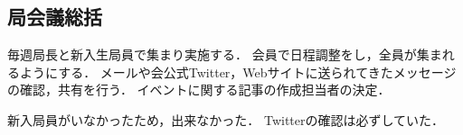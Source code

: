 \subsection*{局会議総括}



毎週局長と新入生局員で集まり実施する．
会員で日程調整をし，全員が集まれるようにする．
メールや会公式Twitter，Webサイトに送られてきたメッセージの確認，共有を行う．
イベントに関する記事の作成担当者の決定．

新入局員がいなかったため，出来なかった．
Twitterの確認は必ずしていた．
